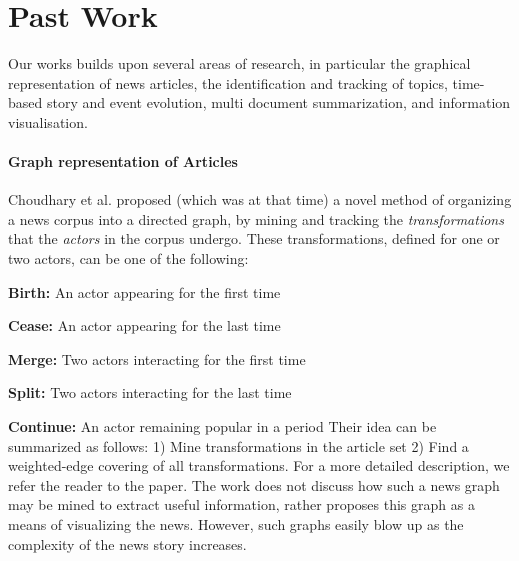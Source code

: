 \section{Past Work}
\label{sec:related}

Our works builds upon several areas of research, in particular the graphical representation of news articles, the identification and tracking of topics, time-based story and event evolution, multi document summarization, and information visualisation.

\paragraph*{Graph representation of Articles} Choudhary et al.\cite{choudhary@ecir2008} proposed (which was at that time) a novel method of organizing a news corpus into a directed graph, by mining and tracking the \emph{transformations} that the \emph{actors} in the corpus undergo. These transformations, defined for one or two actors, can be one of the following:
\squishlist
  \item \textbf{Birth:} An actor appearing for the first time
  \item \textbf{Cease:} An actor appearing for the last time
  \item \textbf{Merge:} Two actors interacting for the first time
  \item \textbf{Split:} Two actors interacting for the last time
  \item \textbf{Continue:} An actor remaining popular in a period
\squishend
Their idea can be summarized as follows: 1) Mine transformations in the article set 2) Find a weighted-edge covering of all transformations.
For a more detailed description, we refer the reader to the paper. The work does not discuss how such a news graph may be mined to extract
useful information, rather proposes this graph as a means of visualizing the news. However, such graphs easily blow up as the complexity
of the news story increases. 

